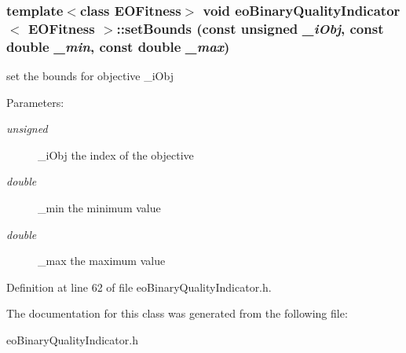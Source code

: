 \subsubsection{\setlength{\rightskip}{0pt plus 5cm}template$<$class EOFitness$>$ void {\bf eo\-Binary\-Quality\-Indicator}$<$ EOFitness $>$::set\-Bounds (const unsigned {\em \_\-i\-Obj}, const double {\em \_\-min}, const double {\em \_\-max})\hspace{0.3cm}{\tt  [inline]}}\label{classeoBinaryQualityIndicator_ed08c328526eb4c1c8cfde8b6938ece9}


set the bounds for objective \_\-i\-Obj 

\begin{Desc}
\item[Parameters:]
\begin{description}
\item[{\em unsigned}]\_\-i\-Obj the index of the objective \item[{\em double}]\_\-min the minimum value \item[{\em double}]\_\-max the maximum value \end{description}
\end{Desc}


Definition at line 62 of file eo\-Binary\-Quality\-Indicator.h.

The documentation for this class was generated from the following file:\begin{CompactItemize}
\item 
eo\-Binary\-Quality\-Indicator.h\end{CompactItemize}
